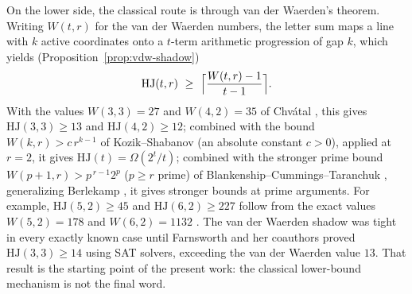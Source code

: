 \documentclass[12pt]{article}
\newcommand{\HJ}{\mathrm{HJ}}
\newcommand{\Wvdw}{W}
\begin{document}
On the lower side, the classical route is through van der Waerden's
theorem. Writing $\Wvdw(t,r)$ for the van der Waerden numbers, the letter
sum maps a line with $k$ active coordinates onto a $t$-term arithmetic
progression of gap $k$, which yields (Proposition~\ref{prop:vdw-shadow})
\begin{equation}\label{eq:vdw-shadow}
\HJ(t,r)\ \ge\ \Bigl\lceil\frac{\Wvdw(t,r)-1}{t-1}\Bigr\rceil .
\end{equation}
With the values $\Wvdw(3,3)=27$ and $\Wvdw(4,2)=35$ of Chv\'atal
\cite{Chvatal1970}, this gives $\HJ(3,3)\ge 13$ and $\HJ(4,2)\ge 12$;
combined with the bound $\Wvdw(k,r)>c\,r^{k-1}$ of
Kozik--Shabanov \cite{kozik2016} (an absolute constant $c>0$), applied
at $r=2$, it gives $\HJ(t)=\Omega(2^{t}/t)$; combined with the stronger
prime bound $\Wvdw(p+1,r)>p^{\,r-1}2^{p}$ ($p\ge r$ prime) of
Blankenship--Cummings--Taranchuk \cite{BLANKENSHIP2018163},
generalizing Berlekamp \cite{Berlekamp1968}, it gives stronger bounds
at prime arguments. For example, $\HJ(5,2)\ge 45$ and $\HJ(6,2)\ge 227$ follow
from the exact values $\Wvdw(5,2)=178$ and $\Wvdw(6,2)=1132$
\cite{LandmanRobertson,KourilPaul2008}. The van der Waerden shadow was
tight in every exactly known case until Farnsworth and her coauthors
\cite{ConlonFarnsworthRobertson2026} proved
$\HJ(3,3)\ge 14$ using SAT solvers, exceeding the van der Waerden value
$13$. That result is the starting point of the present work: the
classical lower-bound mechanism is not the final word.
\end{document}
